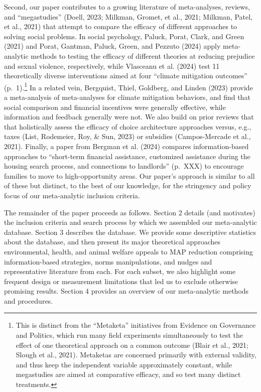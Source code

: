 \documentclass[
  man]{apa6}
\begin{document}
Second, our paper contributes to a growing literature of meta-analyses, reviews, and ``megastudies'' (Doell, 2023; Milkman, Gromet, et al., 2021; Milkman, Patel, et al., 2021) that attempt to compare the efficacy of different approaches to solving social problems. In social psychology, Paluck, Porat, Clark, and Green (2021) and Porat, Gantman, Paluck, Green, and Pezzuto (2024) apply meta-analytic methods to testing the efficacy of different theories at reducing prejudice and sexual violence, respectively, while Vlasceanu et al. (2024) test 11 theoretically diverse interventions aimed at four ``climate mitigation outcomes'' (p.~1).\footnote{This is distinct from the ``Metaketa'' initiatives from Evidence on Governance and Politics, which run many field experiments simultaneously to test the effect of one theoretical approach on a common outcome (Blair et al., 2021; Slough et al., 2021). Metaketas are concerned primarily with external validity, and thus keep the independent variable approximately constant, while megastudies are aimed at comparative efficacy, and so test many distinct treatments.} In a related vein, Bergquist, Thiel, Goldberg, and Linden (2023) provide a meta-analysis of meta-analyses for climate mitigation behaviors, and find that social comparison and financial incentives were generally effective, while information and feedback generally were not. We also build on prior reviews that that holistically assess the efficacy of choice architecture approaches versus, e.g., taxes (List, Rodemeier, Roy, \& Sun, 2023) or subsidies (Campos-Mercade et al., 2021). Finally, a paper from Bergman et al. (2024) compares information-based approaches to ``short-term financial assistance, customized assistance during the housing search process, and connections to landlords'' (p.~XXX) to encourage families to move to high-opportunity areas. Our paper's approach is similar to all of these but distinct, to the best of our knowledge, for the stringency and policy focus of our meta-analytic inclusion criteria.

The remainder of the paper proceeds as follows. Section 2 details (and motivates) the inclusion criteria and search process by which we assembled our meta-analytic database. Section 3 describes the database. We provide some descriptive statistics about the database, and then present its major theoretical approaches \textemdash environmental, health, and animal welfare appeals to MAP reduction comprising information-based strategies, norms manipulations, and nudges \textemdash and representative literature from each. For each subset, we also highlight some frequent design or measurement limitations that led us to exclude otherwise promising results. Section 4 provides an overview of our meta-analytic methods and procedures.
\end{document}
